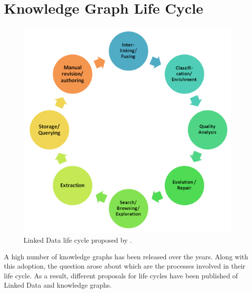 \section{Knowledge Graph Life Cycle }
\label{sec:chp2_kg_lifecycle}





\begin{figure}[t]
\centering
\includegraphics[width=0.55\linewidth]{figures/chp2_LD-lifecycle.png}
\caption{Linked Data life cycle proposed by \cite{ngomo2014LD-lifecycle}.}
\label{fig:chp2_LD-lifecycle}
\end{figure}

A high number of knowledge graphs has been released over the years. Along with this adoption, the question arose about which are the processes involved in their life cycle. As a result, different proposals for life cycles have been published of Linked Data and knowledge graphs.

